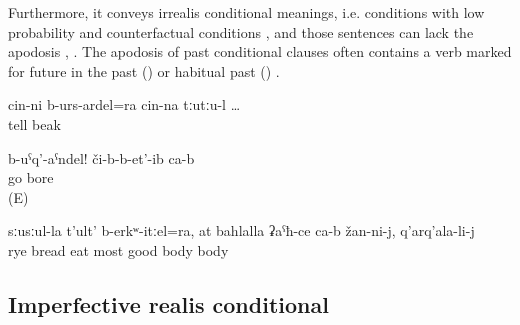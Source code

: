 Furthermore, it conveys irrealis conditional meanings, i.e. conditions with low probability and counterfactual conditions , and those sentences can lack the apodosis , . The apodosis of past conditional clauses often contains a verb marked for future in the past () or habitual past () .
%
\begin{exe}
	\ex	\label{ex:‎if he would have said it with his own mouth}
	\gll	cin-ni	b-urs-ardel=ra	cin-na	tːutːu-l	\ldots\\
			tell		beak\\
	\glt	{}

	\ex	\label{ex:‎‎‎If they would go! They bore (me)}
	\gll	b-uˁq'-aˁndel!	či-b-b-et'-ib	ca-b\\
		go	bore	\\
	\glt	{} (E)

	\ex	\label{ex:if (you) would eat bread made of rye, it is the best thing for you}
	\gll	sːusːul-la	t'ult'	b-erkʷ-itːel=ra,	at	bahlalla	ʡaˁħ-ce	ca-b	žan-ni-j,	q'arq'ala-li-j\\
		rye	bread	eat		most	good		body\tsc{-obl-dat}	body\\
	\glt	{}
\end{exe} 



\subsection{Imperfective realis conditional}
\label{sec:imperfectiverealisconditional}


